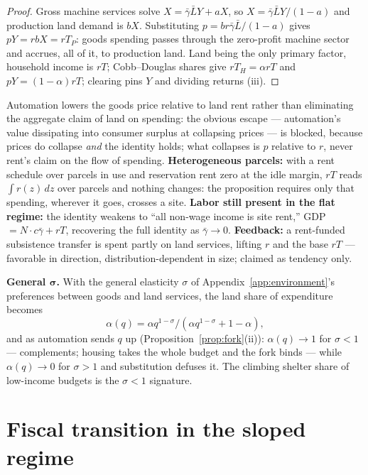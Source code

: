 \documentclass[12pt]{article}
\theoremstyle{plain}
\begin{document}
\begin{proof}
Gross machine services solve $X = \bar{\gamma}\bar{L}Y + aX$, so $X = \bar{\gamma}\bar{L}Y/(1-a)$ and production land demand is $bX$. Substituting $p = br\bar{\gamma}\bar{L}/(1-a)$ gives $pY = r bX = rT_P$: goods spending passes through the zero-profit machine sector and accrues, all of it, to production land. Land being the only primary factor, household income is $rT$; Cobb--Douglas shares give $rT_H = \alpha rT$ and $pY = (1-\alpha )rT$; clearing pins $Y$ and dividing returns (iii).
\end{proof}

Automation lowers the goods price relative to land rent rather than eliminating the aggregate claim of land on spending: the obvious escape --- automation's value dissipating into consumer surplus at collapsing prices --- is blocked, because prices do collapse \emph{and} the identity holds; what collapses is $p$ relative to $r$, never rent's claim on the flow of spending. \textbf{Heterogeneous parcels:} with a rent schedule over parcels in use and reservation rent zero at the idle margin, $rT$ reads $\int r(z)\,dz$ over parcels and nothing changes: the proposition requires only that spending, wherever it goes, crosses a site. \textbf{Labor still present in the flat regime:} the identity weakens to ``all non-wage income is site rent,'' GDP $= N\cdot c\bar{\gamma} + rT$, recovering the full identity as $\bar{\gamma} \to 0$. \textbf{Feedback:} a rent-funded subsistence transfer is spent partly on land services, lifting $r$ and the base $rT$ --- favorable in direction, distribution-dependent in size; claimed as tendency only.

\textbf{General $\bm{\sigma}$.} With the general elasticity $\sigma$ of Appendix~\ref{app:environment}'s preferences between goods and land services, the land share of expenditure becomes
\begin{equation}\label{eq:ces-share}
\alpha (q) = \alpha q^{1-\sigma} / (\alpha q^{1-\sigma} + 1 - \alpha ),
\end{equation}
and as automation sends $q$ up (Proposition~\ref{prop:fork}(ii)): $\alpha (q) \to 1$ for $\sigma < 1$ --- complements; housing takes the whole budget and the fork binds --- while $\alpha (q) \to 0$ for $\sigma > 1$ and substitution defuses it. The climbing shelter share of low-income budgets is the $\sigma < 1$ signature.

\section{Fiscal transition in the sloped regime}\label{app:fiscal}
\end{document}
